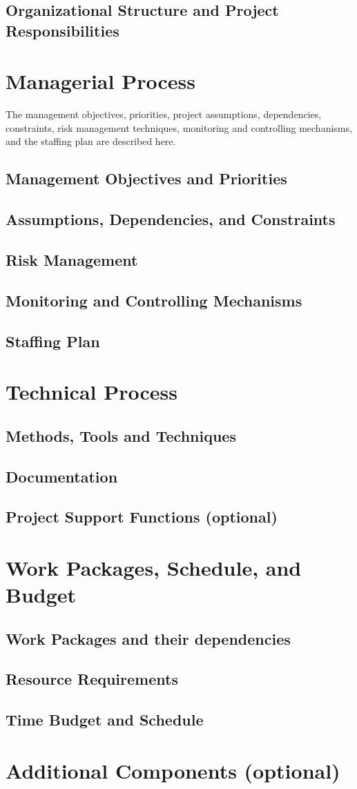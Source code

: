 \documentclass{article}
\begin{document}
\subsection{Organizational Structure and Project Responsibilities}

\section{Managerial Process}
The management objectives, priorities, project assumptions, dependencies,
constraints,
risk
management
techniques,
monitoring
and
controlling
mechanisms, and the staffing plan are described here.

\subsection{Management Objectives and Priorities}
\subsection{Assumptions, Dependencies, and Constraints}
\subsection{Risk Management}
\subsection{Monitoring and Controlling Mechanisms}
\subsection{Staffing Plan}

\section{Technical Process}
\subsection{Methods, Tools and Techniques}
\subsection{Documentation}
\subsection{Project Support Functions (optional)}

\section{Work Packages, Schedule, and Budget}
\subsection{Work Packages and their dependencies}
\subsection{Resource Requirements}
\subsection{Time Budget and Schedule}

\section{Additional Components (optional)}
\end{document}
